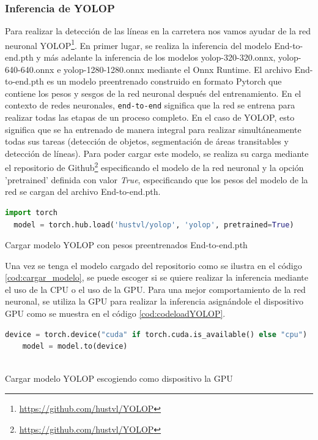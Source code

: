 \subsubsection{Inferencia de YOLOP}
\label{sec:Inferencia de YOLOP}

Para realizar la detección de las líneas en la carretera nos vamos ayudar de la red neuronal YOLOP\footnote{\url{https://github.com/hustvl/YOLOP}}. En primer lugar, 
se realiza la inferencia del modelo End-to-end.pth y más adelante la inferencia de los modelos yolop-320-320.onnx, yolop-640-640.onnx e yolop-1280-1280.onnx mediante el Onnx Runtime. 
El archivo End-to-end.pth es un modelo preentrenado construido en formato Pytorch que contiene los pesos y sesgos de la red neuronal después del entrenamiento. En el contexto de 
redes neuronales, \texttt{end-to-end} significa que la red se entrena para realizar todas las etapas de un proceso completo. En el caso de YOLOP, esto significa que se ha entrenado de manera integral 
para realizar simultáneamente todas sus tareas (detección de objetos, segmentación de áreas transitables y detección de líneas). Para poder cargar este modelo, se realiza 
su carga mediante el repositorio de Github\footnote{\url{https://github.com/hustvl/YOLOP}}
especificando el modelo de la red neuronal y la opción 'pretrained' definida con valor \textit{True}, especificando que los pesos del modelo de la red se cargan del archivo End-to-end.pth.\newline

\begin{code}[h]
  \begin{lstlisting}[language=Python]
  import torch
  model = torch.hub.load('hustvl/yolop', 'yolop', pretrained=True)

  \end{lstlisting}
  \caption[Cargar modelo YOLOP con pesos preentrenados End-to-end.pth]{Cargar modelo YOLOP con pesos preentrenados End-to-end.pth}
  \label{cod:cargar_modelo}
  \end{code}  

Una vez se tenga el modelo cargado del repositorio como se ilustra en el código \ref{cod:cargar_modelo}, se puede escoger 
si se quiere realizar la inferencia mediante el uso de la CPU o el uso de la GPU. Para una mejor comportamiento de la red neuronal, se utiliza
la GPU para realizar la inferencia asignándole el dispositivo GPU como se muestra en el código \ref{cod:codeloadYOLOP}.\newline

  
\begin{code}[h]
    \begin{lstlisting}[language=Python]
    device = torch.device("cuda" if torch.cuda.is_available() else "cpu")
    model = model.to(device)
  
    \end{lstlisting}
    \caption[Cargar modelo YOLOP escogiendo como dispositivo la GPU]{Cargar modelo YOLOP escogiendo como dispositivo la GPU}
    \label{cod:codeloadYOLOP}
    \end{code}  


